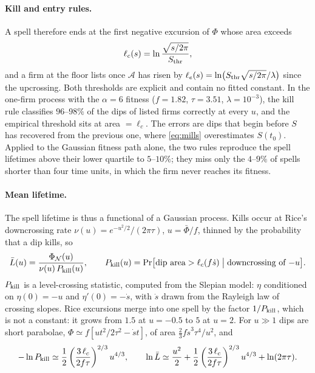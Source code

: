 \documentclass[11pt]{article}
\newcommand{\Sthr}{S_{\rm thr}}
\newcommand{\PhiN}{\Phi_{\mathcal N}}
\newcommand{\bPhi}{\bar\Phi}
\begin{document}
\paragraph{Kill and entry rules.}  A spell therefore ends at the first negative excursion of $\Phi$
whose area exceeds
\begin{equation}
  \ell_c(s)=\ln\frac{\sqrt{s/2\pi}}{\Sthr},
  \label{eq:kill}
\end{equation}
and a firm at the floor lists once $\mathcal A$ has risen by $\ell_e(s)=\ln\bigl(\Sthr\sqrt{s/2\pi}/\lambda\bigr)$
since the upcrossing.  Both thresholds are explicit and contain no fitted constant.  In the
one-firm process with the $\alpha=6$ fitness ($f=1.82$, $\tau=3.51$, $\lambda=10^{-3}$), the kill rule
classifies $96$--$98\%$ of the dips of listed firms correctly at every $u$, and the empirical
threshold sits at area $=\ell_c$.  The errors are dips that begin before $S$ has recovered from
the previous one, where \eqref{eq:mills} overestimates $S(t_0)$.  Applied to the Gaussian
fitness path alone, the two rules reproduce the spell lifetimes above their lower quartile to
$5$--$10\%$; they miss only the $4$--$9\%$ of spells shorter than four time units, in which the
firm never reaches its fitness.

\paragraph{Mean lifetime.}  The spell lifetime is thus a functional of a Gaussian process.  Kills
occur at Rice's downcrossing rate $\nu(u)=e^{-u^2/2}/(2\pi\tau)$, $u=\bPhi/f$, thinned by the
probability that a dip kills, so
\begin{equation}
  \bar L(u)=\frac{\PhiN(u)}{\nu(u)\,P_{\rm kill}(u)},\qquad
  P_{\rm kill}(u)=\Pr\bigl[\text{dip area}>\ell_c(f\dot s)\bigm|\text{downcrossing of }{-u}\bigr].
  \label{eq:lifetime}
\end{equation}
$P_{\rm kill}$ is a level-crossing statistic, computed from the Slepian model: $\eta$
conditioned on $\eta(0)=-u$ and $\eta'(0)=-\dot s$, with $\dot s$ drawn from the Rayleigh law of
crossing slopes.  Rice excursions merge into one spell by the factor $1/P_{\rm kill}$, which is not a constant: it
grows from $1.5$ at $u=-0.5$ to $5$ at $u=2$.  For $u\gg1$ dips are short parabolae,
$\Phi\simeq f[ut^2/2\tau^2-\dot st]$, of area $\tfrac23f\dot s^3\tau^4/u^2$, and
\begin{equation}
  -\ln P_{\rm kill}\simeq\frac12\left(\frac{3\,\ell_c}{2f\tau}\right)^{2/3}u^{4/3},\qquad
  \ln\bar L\simeq\frac{u^2}2+\frac12\left(\frac{3\,\ell_c}{2f\tau}\right)^{2/3}u^{4/3}+\ln(2\pi\tau) .
  \label{eq:largeu}
\end{equation}
\end{document}
